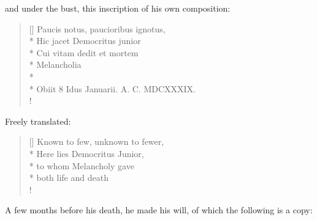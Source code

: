 \documentclass[titlepage,12pt,a4]{octavo}
\begin{document}
and under the bust, this inscription of his own composition:

\settowidth{\versewidth}{Paucis notus, paucioribus ignotus,}
\begin{verse}[\versewidth]
Paucis notus, paucioribus ignotus,\\*
Hic jacet Democritus junior\\*
Cui vitam dedit et mortem\\*
Melancholia\\*
\hrulefill\\*
Obiit 8 Idus Januarii. A. C. MDCXXXIX.\\!
\end{verse}

Freely translated:

\settowidth{\versewidth}{Known to few, unknown to fewer,}
\begin{verse}[\versewidth]
Known to few, unknown to fewer,\\*
Here lies Democritus Junior,\\*
to whom Melancholy gave\\*
both life and death\\!
\end{verse}


A few months before his death, he made his will, of which the following is a copy:
\\
\end{document}

